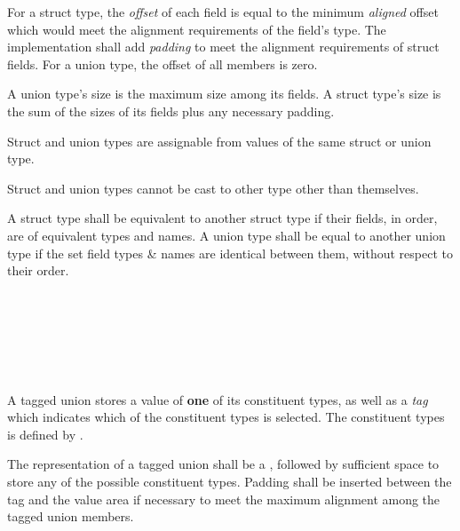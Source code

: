 \specsubsubitem
For a struct type, the \textit{offset} of each field is equal to the minimum
\textit{aligned} offset which would meet the alignment requirements of the
field's type. The implementation shall add \textit{padding} to meet the
alignment requirements of struct fields. For a union type, the offset of all
members is zero.

\specsubsubitem
A union type's size is the maximum size among its fields. A struct type's size
is the sum of the sizes of its fields plus any necessary padding.

\specsubsubitem
Struct and union types are assignable from values of the same struct or union
type.


\specsubsubitem
Struct and union types cannot be cast to other type other than themselves.

\specsubsubitem
A struct type shall be equivalent to another struct type if their fields, in
order, are of equivalent types and names. A union type shall be equal to another
union type if the set field types \& names are identical between them,
without respect to their order.


\begin{grammar}
 \\
	\terminal{(}  \terminal{)} \\

 \\
	 \terminal{|}  \\
	 \terminal{|}  \\
\end{grammar}

\specsubsubitem
A tagged union stores a value of \textbf{one} of its constituent types, as well
as a \textit{tag} which indicates which of the constituent types is selected.
The constituent types is defined by .

\specsubsubitem
The representation of a tagged union shall be a , followed by
sufficient space to store any of the possible constituent types. Padding shall
be inserted between the tag and the value area if necessary to meet the maximum
alignment among the tagged union members.

